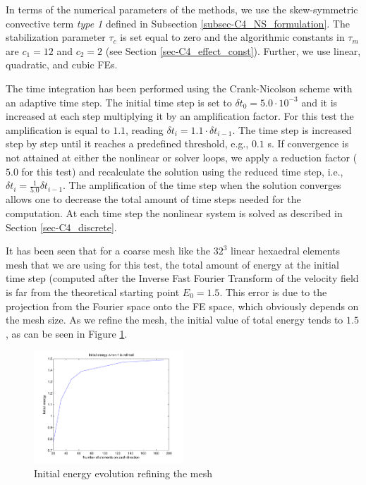 In terms of the numerical parameters of the methods, we use the skew-symmetric convective term \textit{type 1} defined in Subsection \ref{subsec-C4_NS_formulation}. 
The stabilization parameter $\tau_c$ is set equal to zero and the algorithmic constants in $\tau_m$ are $c_1=12$ and $c_2=2$ (see Section \ref{sec-C4_effect_const}).
Further, we use linear, quadratic, and cubic FEs.

The time integration has been performed using the Crank-Nicolson scheme with an adaptive time step. The initial time step is set to $\delta t_0=5.0\cdot10^{-3}$ and it is increased at each step multiplying it by an amplification factor. For this test the amplification is equal to $1.1$, reading $\delta t_i=1.1\cdot\delta t_{i-1}$. The time step is increased step by step until it reaches a predefined threshold, e.g., $0.1$ s. If convergence is not attained at either the nonlinear or solver loops,  we apply a reduction factor ($5.0$ for this test) and recalculate the solution using the reduced time step, i.e., $\delta t_i=\frac{1}{5.0}\delta t_{i-1}$. The amplification of the time step when the solution converges %
allows one to decrease the total amount of time steps needed for the computation. %
At each time step the nonlinear system is solved as described in Section \ref{sec-C4_discrete}. 

It has been seen that for a coarse mesh like the $32^3$ linear hexaedral elements mesh that we are using for this test, the total amount of energy at the initial time step (computed after the Inverse Fast Fourier Transform of the velocity field is far from the theoretical starting point $E_0=1.5$. This error is due to the projection from the Fourier space onto the FE space, which obviously depends on the mesh size. As we refine the mesh, the initial value of total energy tends to $1.5$, as can be seen in Figure \ref{fig:initial_ene}.
\begin{figure}[h!]
	\centering	
	\includegraphics[width=0.5\textwidth]{Figures/Chapter4/DHIT/Initial_ene}
	\caption{Initial energy evolution refining the mesh}
	\label{fig:initial_ene}
\end{figure}

